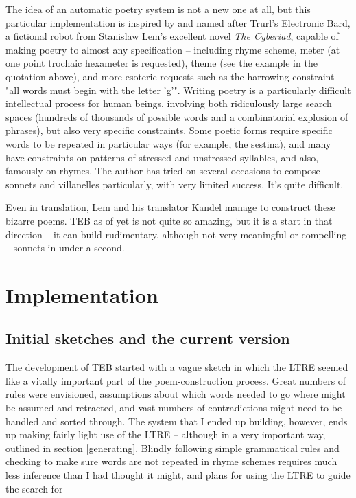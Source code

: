 \documentclass[12pt]{article}
\begin{document}
\bigskip
The idea of an automatic poetry system is not a new one at all, but this
particular implementation is inspired by and named after Trurl's Electronic
Bard, a fictional robot from Stanislaw Lem's excellent novel \emph{The
Cyberiad}, capable of making poetry to almost any specification --
including rhyme scheme, meter (at one point trochaic hexameter is
requested), theme (see the example in the quotation above), and more
esoteric requests such as the harrowing constraint "all words must begin
with the letter 'g'". Writing poetry is a particularly difficult
intellectual process for human beings, involving both ridiculously large
search spaces (hundreds of thousands of possible words and a combinatorial
explosion of phrases), but also very specific constraints. Some poetic
forms require specific words to be repeated in particular ways (for
example, the sestina), and many have constraints on patterns of stressed
and unstressed syllables, and also, famously on rhymes. The author has
tried on several occasions to compose sonnets and villanelles particularly,
with very limited success. It's quite difficult.

\bigskip
Even in translation, Lem and his translator Kandel manage to construct
these bizarre poems. TEB as of yet is not quite so amazing, but it is a
start in that direction -- it can build rudimentary, although not
very meaningful or compelling -- sonnets in under a second.

\section{Implementation}
\subsection{Initial sketches and the current version}
The development of TEB started with a vague sketch in which the LTRE seemed
like a vitally important part of the poem-construction process. Great
numbers of rules were envisioned, assumptions about which words needed to
go where might be assumed and retracted, and vast numbers of contradictions
might need to be handled and sorted through. The system that I ended up
building, however, ends up making fairly light use of the LTRE -- although
in a very important way, outlined in section \ref{generating}. Blindly
following simple grammatical rules and checking to make sure words are not
repeated in rhyme schemes requires much less inference than I had thought
it might, and plans for using the LTRE to guide the search for 
\end{document}
